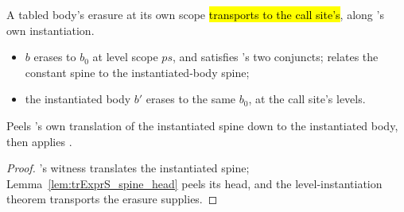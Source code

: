 \begin{lemma}
\label{lem:Erases-instantiateLevelParams_of_stepDefeq}
\leanok
{}
 A tabled body's erasure at its own scope \hl{transports to the call site's}, along
's own instantiation.
\begin{itemize}
\item {} $b$ erases to $b_0$ at level scope $ps$, and satisfies 's two
conjuncts;  relates the constant spine to the instantiated-body spine;
\item {} the instantiated body $b'$ erases to the same $b_0$, at the call site's levels.
\end{itemize}
 Peels 's own translation of the instantiated spine down to the instantiated
body, then applies .
\end{lemma}
\begin{proof}
\leanok
{}
 's witness translates the instantiated spine; Lemma~\ref{lem:trExprS_spine_head}
peels its head, and the level-instantiation theorem transports the erasure  supplies.
\end{proof}

